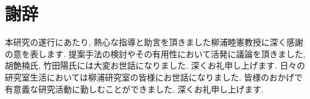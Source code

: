 \chapter*{謝辞}
本研究の遂行にあたり, 熱心な指導と助言を頂きました柳浦睦憲教授に深く感謝の意を表します. 
提案手法の検討やその有用性において活発に議論を頂きました, 胡艶楠氏, 竹田陽氏には大変お世話になりました. 深くお礼申し上げます. 
日々の研究室生活においては柳浦研究室の皆様にお世話になりました. 
皆様のおかげで有意義な研究活動に勤しむことができました. 深くお礼申し上げます. 